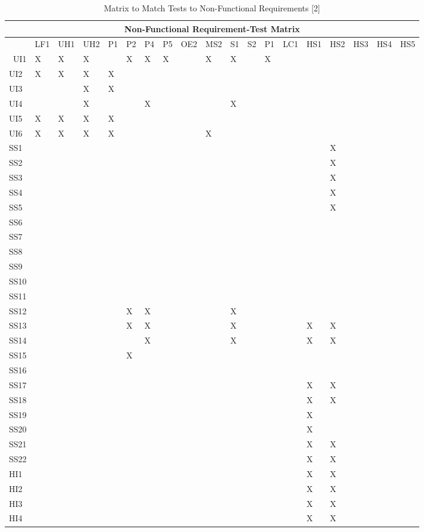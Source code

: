 \documentclass[11pt]{article}
\begin{document}
\begin{table}[H]
\centering
\caption{Matrix to Match Tests to Non-Functional Requirements [2]}
\label{my-label}
\begin{tabular}{| l | l | l | l | l | l | l | l | l | l | l | l | l | l | l | l | l | l | l |}
\hline
\multicolumn{19}{|c|}{\textbf{Non-Functional Requirement-Test Matrix}}                          \\ \hline
 & \tiny{LF1} & \tiny{UH1} & \tiny{UH2} & \tiny{P1} & \tiny{P2} & \tiny{P4} & \tiny{P5} & \tiny{OE2} & \tiny{MS2} & \tiny{S1} & \tiny{S2} & \tiny{P1} & \tiny{LC1} & \tiny{HS1} & \tiny{HS2} & \tiny{HS3} & \tiny{HS4} & \tiny{HS5} \\ \hline\
UI1&X&X&X&&X&X&X&&X&X&&X&&&&&& \\ \hline
UI2&X&X&X&X&&&&&&&&&&&&&& \\ \hline
UI3&&&X&X&&&&&&&&&&&&&& \\ \hline
UI4&&&X&&&X&&&&X&&&&&&&& \\ \hline
UI5&X&X&X&X&&&&&&&&&&&&&& \\ \hline
UI6&X&X&X&X&&&&&X&&&&&&&&& \\ \hline
SS1&&&&&&&&&&&&&&&X&&& \\ \hline
SS2&&&&&&&&&&&&&&&X&&& \\ \hline
SS3&&&&&&&&&&&&&&&X&&& \\ \hline
SS4&&&&&&&&&&&&&&&X&&& \\ \hline
SS5&&&&&&&&&&&&&&&X&&& \\ \hline
SS6&&&&&&&&&&&&&&&&&& \\ \hline
SS7&&&&&&&&&&&&&&&&&& \\ \hline
SS8&&&&&&&&&&&&&&&&&& \\ \hline
SS9&&&&&&&&&&&&&&&&&& \\ \hline
SS10&&&&&&&&&&&&&&&&&& \\ \hline
SS11&&&&&&&&&&&&&&&&&& \\ \hline
SS12&&&&&X&X&&&&X&&&&&&&& \\ \hline
SS13&&&&&X&X&&&&X&&&&X&X&&& \\ \hline
SS14&&&&&&X&&&&X&&&&X&X&&& \\ \hline
SS15&&&&&X&&&&&&&&&&&&& \\ \hline
SS16&&&&&&&&&&&&&&&&&& \\ \hline
SS17&&&&&&&&&&&&&&X&X&&& \\ \hline
SS18&&&&&&&&&&&&&&X&X&&& \\ \hline
SS19&&&&&&&&&&&&&&X&&&& \\ \hline
SS20&&&&&&&&&&&&&&X&&&& \\ \hline
SS21&&&&&&&&&&&&&&X&X&&& \\ \hline
SS22&&&&&&&&&&&&&&X&X&&& \\ \hline
HI1&&&&&&&&&&&&&&X&X&&& \\ \hline
HI2&&&&&&&&&&&&&&X&X&&& \\ \hline
HI3&&&&&&&&&&&&&&X&X&&& \\ \hline
HI4&&&&&&&&&&&&&&X&X&&& \\ \hline
\end{tabular}
\end{table}
\end{document}
